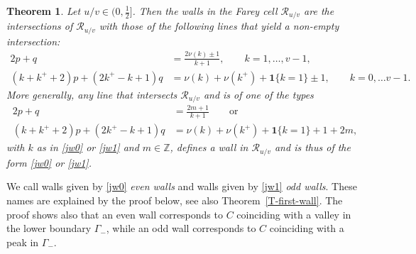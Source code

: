 \documentclass[11pt,reqno,tbtags,a4paper]{amsart}
\numberwithin{equation}{section}
\theoremstyle{plain}%
\newtheorem{theorem}{Theorem}[section]
\theoremstyle{definition}
\theoremstyle{remark}
\newcommand{\refT}[1]{Theorem~\ref{#1}}
\newcommand\xcpar[1]{\{#1\}}
\newcommand\bbZ{\mathbb Z}
\newcommand\gG{\Gamma}
\newcommand\cR{{\mathcal R}}
\newcommand\indic[1]{\boldsymbol1\xcpar{#1}}
\newcommand\uv{_{u/v}}
\newcommand\kx{{k^+}}
\newcommand\0{{\boldsymbol 0}}
\newcommand\1{{\boldsymbol 1}}
\begin{document}
\begin{theorem}\label{TW2}
Let $u/v\in(0,\frac12]$.
Then the walls in the Farey cell $\cR_{u/v}$ are the intersections of 
$\cR_{u/v}$ with those of the following lines that yield a non-empty
intersection: 
\begin{align}
  2p+q&=\frac{2\nu(k)\pm1}{k+1}, \qquad k=1,\dots, v-1,\label{jw0}
%
\\
(k+\kx+2)p+(2\kx-k+1)q&
=\nu(k)+\nu(\kx)+\indic{k=1}\pm1,
\qquad k=0,\dots v-1
.\label{jw1}
\end{align}
More generally, any line that intersects $\cR\uv$ and is of one of the types
\begin{align}\label{jw0+}
  2p+q&=\frac{2m+1}{k+1}
%
\qquad\text{or}
\\\label{jw1+}
(k+\kx+2)p+(2\kx-k+1)q&
=\nu(k)+\nu(\kx)+\indic{k=1}+1+2m,
%
\end{align}
with $k$ as in \eqref{jw0} or \eqref{jw1} and $m\in\bbZ$,
defines a wall in $\cR\uv$ and is thus of the form \eqref{jw0} or
\eqref{jw1}.
\end{theorem}

We call walls given by \eqref{jw0} \emph{even walls}
and walls given by \eqref{jw1} \emph{odd walls}. 
These names are explained by the proof below, 
see also \refT{T-first-wall}.
The proof shows also that an even wall corresponds to $C$ coinciding with 
a valley in the lower boundary $\gG_-$, while an odd wall corresponds to $C$
coinciding with a peak in $\gG_-$.
\end{document}
